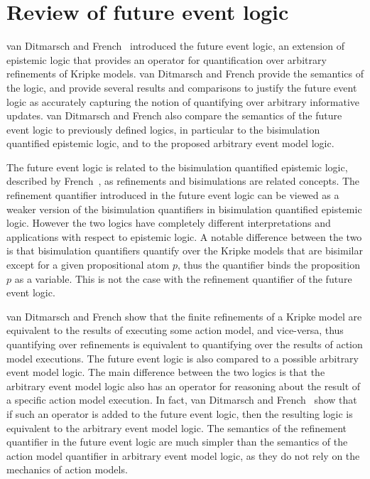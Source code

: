 \section{Review of future event logic}

van Ditmarsch and French~\cite{french2009simulation} introduced the future event
logic, an extension of epistemic logic that provides an operator for
quantification over arbitrary refinements of Kripke models. van Ditmarsch and
French provide the semantics of the logic, and provide several results and
comparisons to justify the future event logic as accurately capturing the notion
of quantifying over arbitrary informative updates. van Ditmarsch and French also 
compare the semantics of the future event logic to previously defined logics, in
particular to the bisimulation quantified epistemic logic, and to the proposed
arbitrary event model logic.

The future event logic is related to the bisimulation quantified epistemic
logic, described by French~\cite{french2006bisimulation}, as refinements and
bisimulations are related concepts. The refinement quantifier introduced in the
future event logic can be viewed as a weaker version of the bisimulation
quantifiers in bisimulation quantified epistemic logic. However the two logics
have completely different interpretations and applications with respect to
epistemic logic. A notable difference between the two is that bisimulation
quantifiers quantify over the Kripke models that are bisimilar except for a
given propositional atom $p$, thus the quantifier binds the proposition $p$ as a
variable. This is not the case with the refinement quantifier of the future
event logic. %

van Ditmarsch and French show that the finite refinements of a Kripke
model are equivalent to the results of executing some action model, and
vice-versa, thus quantifying over refinements is equivalent to quantifying over
the results of action model executions. The future event logic is also compared
to a possible arbitrary event model logic. The main difference between the two
logics is that the arbitrary event model logic also has an operator for
reasoning about the result of a specific action model execution. In fact, van
Ditmarsch and French~\cite{french2009simulation} show that if such an operator
is added to the future event logic, then the resulting logic is equivalent to
the arbitrary event model logic. The semantics of the refinement quantifier in
the future event logic are much simpler than the semantics of the action model
quantifier in arbitrary event model logic, as they do not rely on the mechanics
of action models.

